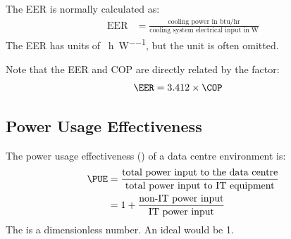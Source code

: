 \documentclass{pgnotes}
\begin{document}
The EER is normally calculated as:
\begin{align}
  \mbox{EER} & = \frac{\mbox{cooling power in btu/hr}}{\mbox{cooling system electrical input in W}}
\end{align}
The EER has units of \si{\BTU\per\hour\per\watt}, but the unit is often omitted.


Note that the EER and COP are directly related by the factor:
\begin{align}
  \EER & = 3.412 \times \COP
\end{align}

\subsection{Power Usage Effectiveness}

The power usage effectiveness (\PUE) of a data centre environment is:
\begin{align}
  \PUE & = \frac{\mbox{total power input to the data centre}}{\mbox{total power input to IT equipment}} \\
       & = 1 + \frac{\mbox{non-IT power input}}{\mbox{IT power input}}
\end{align}
The \PUE is a dimensionless number.
An ideal \PUE would be 1.
\end{document}
